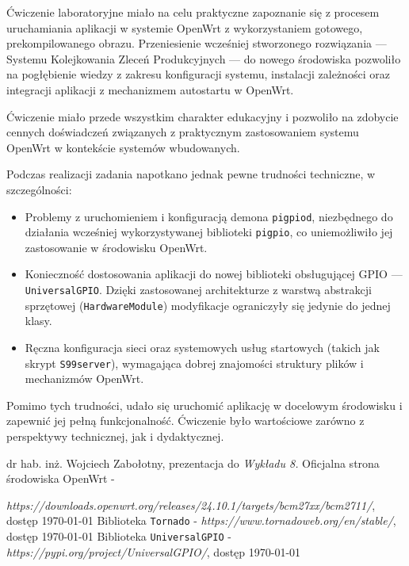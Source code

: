 \documentclass{article}
\begin{document}
Ćwiczenie laboratoryjne miało na celu praktyczne zapoznanie się z procesem uruchamiania aplikacji w systemie OpenWrt z wykorzystaniem gotowego, prekompilowanego obrazu. Przeniesienie wcześniej stworzonego rozwiązania — Systemu Kolejkowania Zleceń Produkcyjnych — do nowego środowiska pozwoliło na pogłębienie wiedzy z zakresu konfiguracji systemu, instalacji zależności oraz integracji aplikacji z mechanizmem autostartu w OpenWrt.

Ćwiczenie miało przede wszystkim charakter edukacyjny i pozwoliło na zdobycie cennych doświadczeń związanych z praktycznym zastosowaniem systemu OpenWrt w kontekście systemów wbudowanych. 

Podczas realizacji zadania napotkano jednak pewne trudności techniczne, w szczególności:

\begin{itemize}
    \item Problemy z uruchomieniem i konfiguracją demona \texttt{pigpiod}, niezbędnego do działania wcześniej wykorzystywanej biblioteki \texttt{pigpio}, co uniemożliwiło jej zastosowanie w środowisku OpenWrt.
    \item Konieczność dostosowania aplikacji do nowej biblioteki obsługującej GPIO — \texttt{UniversalGPIO}. Dzięki zastosowanej architekturze z warstwą abstrakcji sprzętowej (\texttt{HardwareModule}) modyfikacje ograniczyły się jedynie do jednej klasy.
    \item Ręczna konfiguracja sieci oraz systemowych usług startowych (takich jak skrypt \texttt{S99server}), wymagająca dobrej znajomości struktury plików i mechanizmów OpenWrt.
\end{itemize}

Pomimo tych trudności, udało się uruchomić aplikację w docelowym środowisku i zapewnić jej pełną funkcjonalność. Ćwiczenie było wartościowe zarówno z perspektywy technicznej, jak i dydaktycznej.



\begin{thebibliography}{9}
 dr hab. inż. Wojciech Zabołotny, prezentacja do \textit{Wykładu 8.}
 Oficjalna strona środowiska OpenWrt -

\textit{https://downloads.openwrt.org/releases/24.10.1/targets/bcm27xx/bcm2711/}, dostęp \today
{} Biblioteka \texttt{Tornado} - \textit{https://www.tornadoweb.org/en/stable/}, dostęp \today
{} Biblioteka \texttt{UniversalGPIO} - \textit{https://pypi.org/project/UniversalGPIO/}, dostęp \today
\end{thebibliography}
\end{document}

